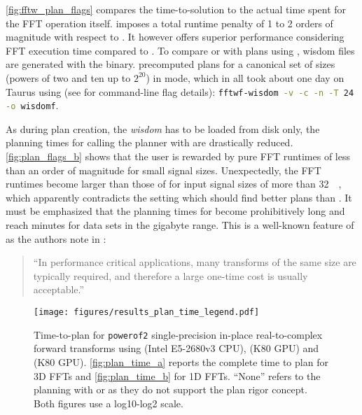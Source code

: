 \cref{fig:fftw_plan_flags} compares the time-to-solution to the actual time spent for the FFT operation itself.  imposes a total runtime penalty of 1 to 2 orders of magnitude with respect to . It however offers superior performance considering FFT execution time compared to . To compare  or  with plans using , wisdom files are generated with the  binary.  precomputed plans for a canonical set of sizes (powers of two and ten up to $2^{20}$) in  mode, which in all took about one day on Taurus \cite{taurus} using (see \cite{fftw_manual} for command-line flag details):
\lstinline[language=bash]!fftwf-wisdom -v -c -n -T 24 -o wisdomf!.

As during plan creation, the \emph{wisdom} has to be loaded from disk only, the planning times for calling the planner with  are drastically reduced. \cref{fig:plan_flags_b} shows that the user is rewarded by pure FFT runtimes of less than an order of magnitude for small signal sizes. Unexpectedly, the FFT runtimes become larger than those of  for input signal sizes of more than \SI{32}{\kibi\byte}, which apparently contradicts the  setting which should find better plans than .
%
It must be emphasized that the planning times for  become prohibitively long and reach minutes for data sets in the gigabyte range. This is a well-known feature of \fftw{} as the authors note in \cite{FFTW05}:
%
\begin{quote}
  ``In performance critical applications, many transforms of the same
  size are typically required, and therefore a large one-time cost is
  usually acceptable.''
\end{quote}

\begin{figure}[!tbp]
  \centering
  \texttt{[image: figures/results\_plan\_time\_legend.pdf]}\vspace{-1em}
  \hfill
  \caption{Time-to-plan for \texttt{powerof2} single-precision in-place real-to-complex forward transforms using \fftw{} (Intel E5-2680v3 CPU), \cufft{} (K80 GPU) and \clfft{} (K80 GPU). \cref{fig:plan_time_a} reports the complete time to plan for 3D FFTs and \cref{fig:plan_time_b} for 1D FFTs. ``None'' refers to the planning with \cufft{} or \clfft{} as they do not support the plan rigor concept. Both figures use a log10-log2 scale.}
  \label{fig:plan_time}
\end{figure}

